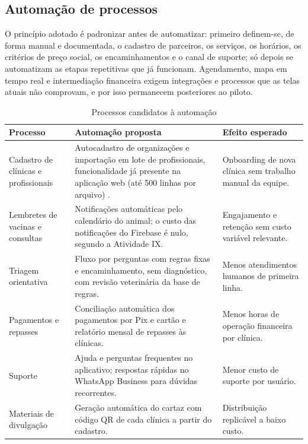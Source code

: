 \subsection{Automação de processos}

O princípio adotado é padronizar antes de automatizar: primeiro definem-se, de forma manual e documentada, o cadastro de parceiros, os serviços, os horários, os critérios de preço social, os encaminhamentos e o canal de suporte; só depois se automatizam as etapas repetitivas que já funcionam. Agendamento, mapa em tempo real e intermediação financeira exigem integrações e processos que as telas atuais não comprovam, e por isso permanecem posteriores ao piloto.

\begin{table}[htb]
\centering
\caption{Processos candidatos à automação}
\label{tab:automacao}
\begin{tabularx}{\textwidth}{L{3.2cm} Y Y}
\toprule
\textbf{Processo} & \textbf{Automação proposta} & \textbf{Efeito esperado}\\
\midrule
Cadastro de clínicas e profissionais & Autocadastro de organizações e importação em lote de profissionais, funcionalidade já presente na aplicação web (até 500 linhas por arquivo) \cite{cassino2026repo}. & Onboarding de nova clínica sem trabalho manual da equipe.\\
Lembretes de vacinas e consultas & Notificações automáticas pelo calendário do animal; o custo das notificações do Firebase é nulo, segundo a Atividade IX. & Engajamento e retenção sem custo variável relevante.\\
Triagem orientativa & Fluxo por perguntas com regras fixas e encaminhamento, sem diagnóstico, com revisão veterinária da base de regras. & Menos atendimentos humanos de primeira linha.\\
Pagamentos e repasses & Conciliação automática dos pagamentos por Pix e cartão e relatório mensal de repasses às clínicas. & Menos horas de operação financeira por clínica.\\
Suporte & Ajuda e perguntas frequentes no aplicativo; respostas rápidas no WhatsApp Business para dúvidas recorrentes. & Menor custo de suporte por usuário.\\
Materiais de divulgação & Geração automática do cartaz com código QR de cada clínica a partir do cadastro. & Distribuição replicável a baixo custo.\\
\bottomrule
\end{tabularx}
\fonteautores
\end{table}

